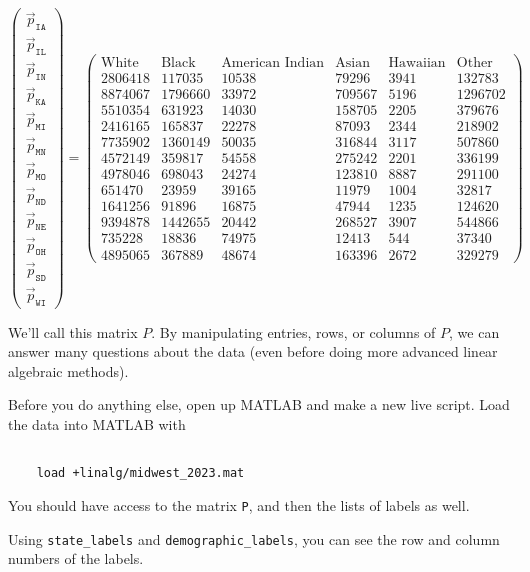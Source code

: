 \documentclass{ximera}
\begin{document}
\begin{example}
\[
  \begin{pmatrix}
  \vec{p}_{\texttt{IA}} \\
  \vec{p}_{\texttt{IL}} \\
  \vec{p}_{\texttt{IN}} \\
  \vec{p}_{\texttt{KA}} \\
  \vec{p}_{\texttt{MI}} \\
  \vec{p}_{\texttt{MN}} \\
  \vec{p}_{\texttt{MO}} \\
  \vec{p}_{\texttt{ND}} \\
  \vec{p}_{\texttt{NE}} \\
  \vec{p}_{\texttt{OH}} \\
  \vec{p}_{\texttt{SD}} \\
  \vec{p}_{\texttt{WI}}
  \end{pmatrix}
  =
  \begin{pmatrix}
    \text{White} & \text{Black} & \text{American Indian} & \text{Asian} & \text{Hawaiian} & \text{Other} \\
  2806418 & 117035 & 10538 & 79296 & 3941 & 132783\\
  8874067 & 1796660 & 33972 & 709567 & 5196 & 1296702\\
  5510354 & 631923 & 14030 & 158705 & 2205 & 379676\\
  2416165 & 165837 & 22278 & 87093 & 2344 & 218902\\
  7735902 & 1360149 & 50035 & 316844 & 3117 & 507860\\
  4572149 & 359817 & 54558 & 275242 & 2201 & 336199\\
  4978046 & 698043 & 24274 & 123810 & 8887 & 291100\\
  651470 & 23959 & 39165 & 11979 & 1004 & 32817\\
  1641256 & 91896 & 16875 & 47944 & 1235 & 124620\\
  9394878 & 1442655 & 20442 & 268527 & 3907 & 544866\\
  735228 & 18836 & 74975 & 12413 & 544 & 37340\\
  4895065 & 367889 & 48674 & 163396 & 2672 & 329279
  \end{pmatrix}
  \]

  We'll call this matrix $P$. By manipulating entries, rows, or columns of $P$, we can answer many questions about the data (even before doing more advanced linear algebraic methods).

  Before you do anything else, open up MATLAB and make a new live script. Load the data into MATLAB with 

  \begin{verbatim}
  
    load +linalg/midwest_2023.mat

  \end{verbatim}

  You should have access to the matrix \texttt{P}, and then the lists of labels as well.

  Using \texttt{state\_labels} and \texttt{demographic\_labels}, you can see the row and column numbers of the labels.

\end{example}
\end{document}
